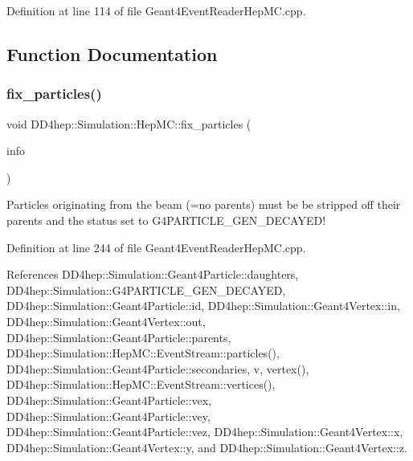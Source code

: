 Definition at line 114 of file Geant4\+Event\+Reader\+Hep\+M\+C.\+cpp.



\subsection{Function Documentation}
\hypertarget{namespace_d_d4hep_1_1_simulation_1_1_hep_m_c_a07b61ea67e59ff0e064a976336f7f3f3}{}\label{namespace_d_d4hep_1_1_simulation_1_1_hep_m_c_a07b61ea67e59ff0e064a976336f7f3f3} 
\subsubsection{\texorpdfstring{fix\+\_\+particles()}{fix\_particles()}}
{\footnotesize\ttfamily void D\+D4hep\+::\+Simulation\+::\+Hep\+M\+C\+::fix\+\_\+particles (\begin{DoxyParamCaption}\item[{\hyperlink{class_d_d4hep_1_1_simulation_1_1_hep_m_c_1_1_event_stream}{Event\+Stream} \&}]{info }\end{DoxyParamCaption})}

Particles originating from the beam (=no parents) must be be stripped off their parents and the status set to G4\+P\+A\+R\+T\+I\+C\+L\+E\+\_\+\+G\+E\+N\+\_\+\+D\+E\+C\+A\+Y\+E\+D! 

Definition at line 244 of file Geant4\+Event\+Reader\+Hep\+M\+C.\+cpp.



References D\+D4hep\+::\+Simulation\+::\+Geant4\+Particle\+::daughters, D\+D4hep\+::\+Simulation\+::\+G4\+P\+A\+R\+T\+I\+C\+L\+E\+\_\+\+G\+E\+N\+\_\+\+D\+E\+C\+A\+Y\+ED, D\+D4hep\+::\+Simulation\+::\+Geant4\+Particle\+::id, D\+D4hep\+::\+Simulation\+::\+Geant4\+Vertex\+::in, D\+D4hep\+::\+Simulation\+::\+Geant4\+Vertex\+::out, D\+D4hep\+::\+Simulation\+::\+Geant4\+Particle\+::parents, D\+D4hep\+::\+Simulation\+::\+Hep\+M\+C\+::\+Event\+Stream\+::particles(), D\+D4hep\+::\+Simulation\+::\+Geant4\+Particle\+::secondaries, v, vertex(), D\+D4hep\+::\+Simulation\+::\+Hep\+M\+C\+::\+Event\+Stream\+::vertices(), D\+D4hep\+::\+Simulation\+::\+Geant4\+Particle\+::vex, D\+D4hep\+::\+Simulation\+::\+Geant4\+Particle\+::vey, D\+D4hep\+::\+Simulation\+::\+Geant4\+Particle\+::vez, D\+D4hep\+::\+Simulation\+::\+Geant4\+Vertex\+::x, D\+D4hep\+::\+Simulation\+::\+Geant4\+Vertex\+::y, and D\+D4hep\+::\+Simulation\+::\+Geant4\+Vertex\+::z.



